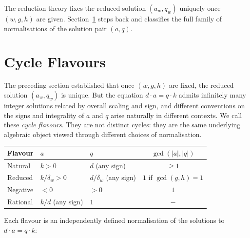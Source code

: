 \documentclass[12pt]{article}
\theoremstyle{definition}
\theoremstyle{remark}
\begin{document}
The reduction theory fixes the reduced solution $(a_w, q_w)$ uniquely once
$(w, g, h)$ are given.  Section~\ref{sec:cycle-flavours} steps back and
classifies the full family of normalisations of the solution pair $(a, q)$.

\section{Cycle Flavours}
\label{sec:cycle-flavours}

The preceding section established that once $(w, g, h)$ are fixed, the
reduced solution $(a_w, q_w)$ is unique.  But the equation $d \cdot a = q \cdot k$
admits infinitely many integer solutions related by overall scaling and sign,
and different conventions on the signs and integrality of $a$ and $q$
arise naturally in different contexts.  We call these \emph{cycle flavours}.
They are not distinct cycles: they are the same underlying algebraic object
viewed through different choices of normalisation.

\begin{center}
\renewcommand{\arraystretch}{1.4}
\begin{tabular}{lllc}
\hline
\textbf{Flavour} & \textbf{$a$} & \textbf{$q$} & \textbf{$\gcd(|a|,|q|)$} \\
\hline
Natural  & $k > 0$ & $d$ (any sign) & $\geq 1$ \\
Reduced  & $k/\delta_w > 0$ & $d/\delta_w$ (any sign) & $1$ if $\gcd(g,h)=1$ \\
Negative & $< 0$ & $> 0$ & $1$ \\
Rational & $k/d$ (any sign) & $1$ & $-$ \\
\hline
\end{tabular}
\end{center}

Each flavour is an independently defined normalisation of the solutions
to $d \cdot a = q \cdot k$:
\end{document}
